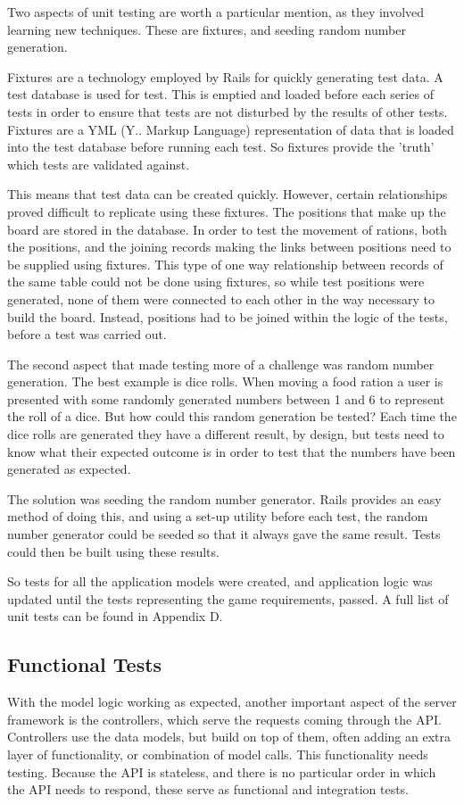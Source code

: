 Two aspects of unit testing are worth a particular mention, as they involved learning new techniques. These are fixtures, and seeding random number generation.

Fixtures are a technology employed by Rails for quickly generating test data. A test database is used for test. This is emptied and loaded before each series of tests in order to ensure that tests are not disturbed by the results of other tests. Fixtures are a YML (Y.. Markup Language) representation of data that is loaded into the test database before running each test. So fixtures provide the 'truth' which tests are validated against.

This means that test data can be created quickly. However, certain relationships proved difficult to replicate using these fixtures. The positions that make up the board are stored in the database. In order to test the movement of rations, both the positions, and the joining records making the links between positions need to be supplied using fixtures. This type of one way relationship between records of the same table could not be done using fixtures, so while test positions were generated, none of them were connected to each other in the way necessary to build the board. Instead, positions had to be joined within the logic of the tests, before a test was carried out.

The second aspect that made testing more of a challenge was random number generation. The best example is dice rolls. When moving a food ration a user is presented with some randomly generated numbers between 1 and 6 to represent the roll of a dice. But how could this random generation be tested? Each time the dice rolls are generated they have a different result, by design, but tests need to know what their expected outcome is in order to test that the numbers have been generated as expected.

The solution was seeding the random number generator. Rails provides an easy method of doing this, and using a set-up utility before each test, the random number generator could be seeded so that it always gave the same result. Tests could then be built using these results.

So tests for all the application models were created, and application logic was updated until the tests representing the game requirements, passed. A full list of unit tests can be found in Appendix D.

\subsection{Functional Tests}
With the model logic working as expected, another important aspect of the server framework is the controllers, which serve the requests coming through the API. Controllers use the data models, but build on top of them, often adding an extra layer of functionality, or combination of model calls. This functionality needs testing. Because the API is stateless, and there is no particular order in which the API needs to respond, these serve as functional and integration tests.

